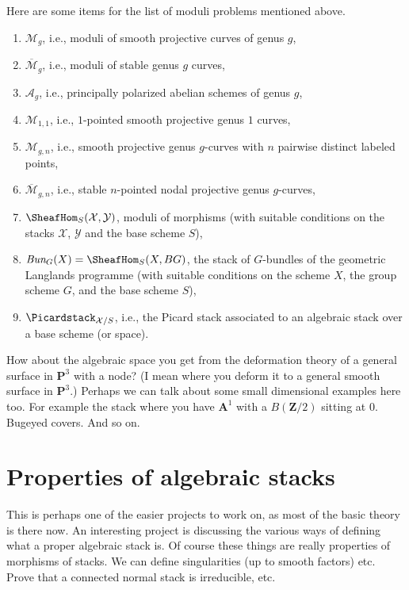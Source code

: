 \medskip\noindent
Here are some items for the list of moduli problems mentioned above.
\begin{enumerate}
\item $\mathcal{M}_g$, i.e., moduli of smooth projective curves of genus $g$,
\item $\overline{\mathcal{M}}_g$, i.e., moduli of stable genus $g$ curves,
\item $\mathcal{A}_g$,
i.e., principally polarized abelian schemes of genus $g$,
\item $\mathcal{M}_{1, 1}$, i.e.,
$1$-pointed smooth projective genus $1$ curves,
\item $\mathcal{M}_{g, n}$, i.e., smooth projective genus $g$-curves
with $n$ pairwise distinct labeled points,
\item $\overline{\mathcal{M}}_{g, n}$, i.e.,
stable $n$-pointed nodal projective genus $g$-curves,
\item $\SheafHom_S(\mathcal{X}, \mathcal{Y})$, moduli of morphisms
(with suitable conditions on the stacks $\mathcal{X}$, $\mathcal{Y}$
and the base scheme $S$),
\item $\textit{Bun}_G(X) = \SheafHom_S(X, BG)$, the stack of $G$-bundles
of the geometric Langlands programme (with suitable conditions on the scheme
$X$, the group scheme $G$, and the base scheme $S$),
\item $\Picardstack_{\mathcal{X}/S}$, i.e., the Picard stack associated
to an algebraic stack over a base scheme (or space).
\end{enumerate}
How about the algebraic space you get from the deformation theory of
a general surface in $\mathbf{P}^3$ with a node? (I mean where you deform
it to a general smooth surface in $\mathbf{P}^3$.)
Perhaps we can talk about some small dimensional examples here too.
For example the stack where you have $\mathbf{A}^1$ with a $B(\mathbf{Z}/2)$
sitting at $0$. Bugeyed covers. And so on.


\section{Properties of algebraic stacks}
\label{section-stacks-properties}

\noindent
This is perhaps one of the easier projects to work on, as most of the
basic theory is there now. An interesting project is discussing the
various ways of defining what a proper algebraic stack is.
Of course these things are really properties of morphisms of stacks.
We can define singularities (up to smooth factors) etc. Prove that a
connected normal stack is irreducible, etc.


